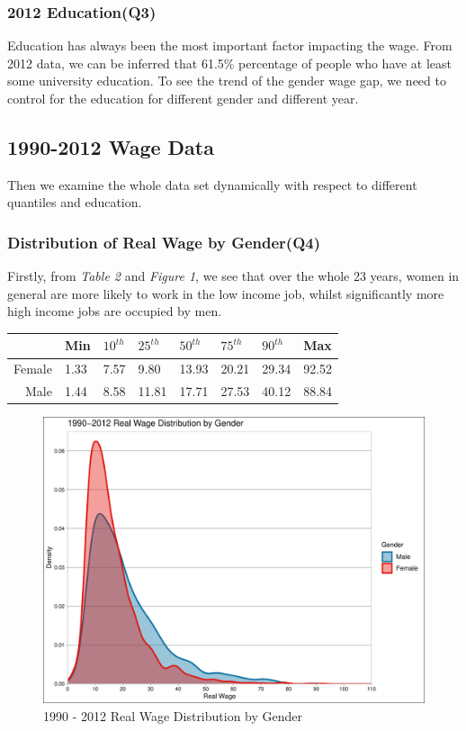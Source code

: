 \documentclass{article}
\begin{document}
\subsubsection{2012 Education(Q3)}
Education has always been the most important factor impacting the wage. From 2012 data, we can be inferred that 61.5\% percentage of people who have at least some university education. To see the trend of the gender wage gap, we need to control for the education for different gender and different year.\\

\subsection{1990-2012 Wage Data}
Then we examine the whole data set dynamically with respect to different quantiles and education.
\subsubsection{Distribution of Real Wage by Gender(Q4)}
Firstly, from \textit{Table 2} and \textit{Figure 1},  we see that over the whole 23 years, women in general are more likely to work in the low income job, whilst significantly more high income jobs are occupied by men.
\begin{table}[H]
\centering
\captionsetup{labelfont=bf}
\label{tab:title}
\begin{tabular}{rlllllll}
  \hline
 & Min & $10^{th}$ & $25^{th}$  & $50^{th}$ & $75^{th}$ & $90^{th}$ & Max \\ 
  \hline
Female &  1.33 &  7.57 &  9.80 & 13.93 & 20.21 & 29.34 & 92.52 \\ 
  Male &  1.44 &  8.58 & 11.81 & 17.71 & 27.53 & 40.12 & 88.84 \\ 
   \hline
\end{tabular}
\end{table}

\begin{figure}[H]
    \centering
    \includegraphics[width=120mm,scale=0.9]{q4p.pdf}
    \caption{1990 - 2012 Real Wage Distribution by Gender}
    \label{fig:my_label}
\end{figure}
\end{document}
